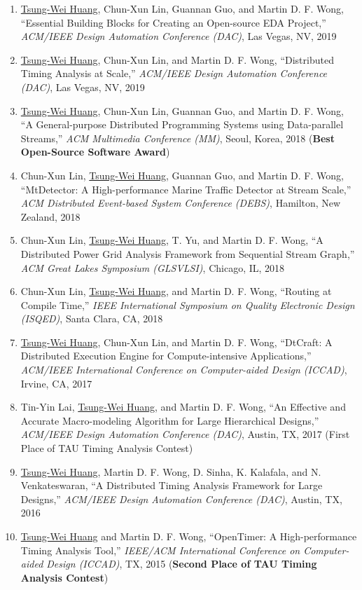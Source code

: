 \documentclass[A4,11pt]{article}
\begin{document}
\begin{enumerate}
    \item \underline{Tsung-Wei Huang}, Chun-Xun Lin, Guannan Guo, and Martin D. F. Wong, ``Essential Building Blocks for Creating an Open-source EDA Project,'' \textit{ACM/IEEE Design Automation Conference (DAC)}, Las Vegas, NV, 2019
    \item \underline{Tsung-Wei Huang}, Chun-Xun Lin, and Martin D. F. Wong, ``Distributed Timing Analysis at Scale,'' \textit{ACM/IEEE Design Automation Conference (DAC)}, Las Vegas, NV, 2019
    \item \underline{Tsung-Wei Huang}, Chun-Xun Lin, Guannan Guo, and Martin D. F. Wong, ``A General-purpose Distributed Programming Systems using Data-parallel Streams,'' \textit{ACM Multimedia Conference (MM)}, Seoul, Korea, 2018 (\textbf{Best Open-Source Software Award}) 
    \item Chun-Xun Lin, \underline{Tsung-Wei Huang}, Guannan Guo, and Martin D. F. Wong, ``MtDetector: A High-performance Marine Traffic Detector at Stream Scale,'' \textit{ACM Distributed Event-based System Conference (DEBS)}, Hamilton, New Zealand, 2018
    \item Chun-Xun Lin, \underline{Tsung-Wei Huang}, T. Yu, and Martin D. F. Wong, ``A Distributed Power Grid Analysis Framework from Sequential Stream Graph,'' \textit{ACM Great Lakes Symposium (GLSVLSI)}, Chicago, IL, 2018
    \item Chun-Xun Lin, \underline{Tsung-Wei Huang}, and Martin D. F. Wong, ``Routing at Compile Time,'' \textit{IEEE International Symposium on Quality Electronic Design (ISQED)}, Santa Clara, CA, 2018
    \item \underline{Tsung-Wei Huang}, Chun-Xun Lin, and Martin D. F. Wong, ``DtCraft: A Distributed Execution Engine for Compute-intensive Applications,'' \textit{ACM/IEEE International Conference on Computer-aided Design (ICCAD)}, Irvine, CA, 2017
    \item Tin-Yin Lai, \underline{Tsung-Wei Huang}, and Martin D. F. Wong, ``An Effective and Accurate Macro-modeling Algorithm for Large Hierarchical Designs,'' \textit{ACM/IEEE Design Automation Conference (DAC)}, Austin, TX, 2017 (First Place of TAU Timing Analysis Contest)
    \item \underline{Tsung-Wei Huang}, Martin D. F. Wong, D. Sinha, K. Kalafala, and N. Venkateswaran, ``A Distributed Timing Analysis Framework for Large Designs,'' \textit{ACM/IEEE Design Automation Conference (DAC)}, Austin, TX, 2016
    \item \underline{Tsung-Wei Huang} and Martin D. F. Wong, ``OpenTimer: A High-performance Timing Analysis Tool,'' \textit{IEEE/ACM International Conference on Computer-aided Design (ICCAD)}, TX, 2015 (\textbf{Second Place of TAU Timing Analysis Contest})

\end{enumerate}
\end{document}
